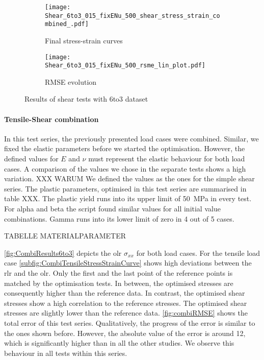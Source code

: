 \begin{figure}[H]
\centering
\begin{subfigure}[t]{0.495\textwidth}
    \centering
     \texttt{[image: Shear\_6to3\_015\_fixENu\_500\_shear\_stress\_strain\_combined\_.pdf]}
        \caption{Final stress-strain curves}
        \label{subfig:shearStressStrain6to3}
\end{subfigure}
\hfill
\begin{subfigure}[t]{0.495\textwidth}
    \centering
    \texttt{[image: Shear\_6to3\_015\_fixENu\_500\_rsme\_lin\_plot.pdf]}
        \caption{ RMSE evolution}
        \label{subfig:shearRMSE}
\end{subfigure}
\caption{Results of shear tests with 6to3 dataset}
\label{fig:shearResults6to3}
\end{figure}

\paragraph{Tensile-Shear combination}

In this test series, the previously presented load cases were combined. Similar, we fixed the elastic parameters before we started the optimisation. However, the defined values for $E$ and $\nu$ must represent the elastic behaviour for both load cases. A comparison of the values we chose in the separate tests shows a high variation. XXX WARUM 
We defined the values as the ones for the simple shear series. The plastic parameters, optimised in this test series are summarised in table XXX. The plastic yield runs into its upper limit of 50 MPa in every test. For alpha and beta the script found similar values for all initial value combinations. Gamma runs into its lower limit of zero in 4 out of 5 cases. 

TABELLE MATERIALPARAMETER

\autoref{fig:CombiResults6to3} depicts the \acrlong{olr} $\sigma_{xx}$ for both load cases. For the tensile load case \autoref{subfig:CombiTensileStressStrainCurve} shows high deviations between the \acrlong{rlr} and the \acrlong{olr}. Only the first and the last point of the reference points is matched by the optimisation tests. In between, the optimised stresses are consequently higher than the reference data. In contrast, the optimised shear stresses show a high correlation to the reference stresses. The optimised shear stresses are slightly lower than the reference data. \autoref{fig:combiRMSE} shows the total error of this test series. Qualitatively, the progress of the error is similar to the ones shown before. However, the absolute value of the error is around 12, which is significantly higher than in all the other studies. We observe this behaviour in all tests within this series. 

